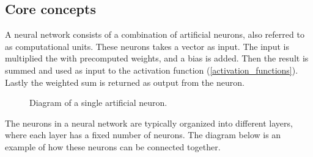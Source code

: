 \subsection{Core concepts}


A neural network consists of a combination of artificial neurons, also referred to as computational units. These neurons takes a vector as input. The input is multiplied the with precomputed weights, and a bias is added. Then the result is summed and used as input to the activation function (\ref{activation_functions}). Lastly the weighted sum is returned as output from the neuron. \parencite{_cs231n_????} \parencite{_multi-layer_????}



\begin{figure}[H]
  \centering
    \caption{Diagram of a single artificial neuron.} %
    \label{fig:single_neuron}

\end{figure}

The neurons in a neural network are typically organized into different layers, where each layer has a fixed number of neurons. The diagram below is an example of how these neurons can be connected together.

